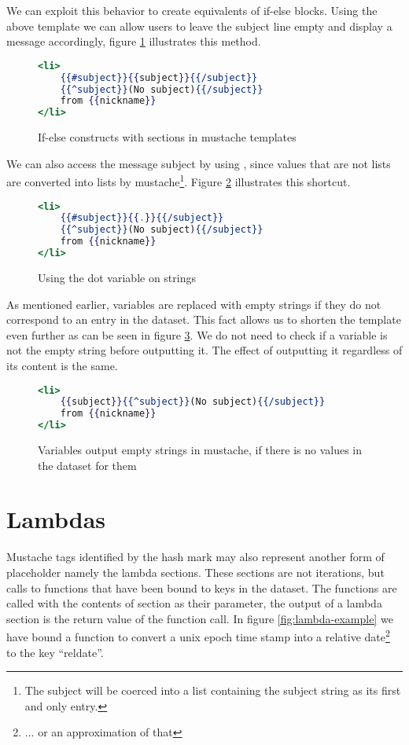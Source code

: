 \documentclass[thesis.tex]{subfiles}
\begin{document}
We can exploit this behavior to create equivalents of if-else blocks.
Using the above template we can allow users to leave the subject line empty
and display a message accordingly, figure \ref{fig:ifelse.mustache} illustrates
this method.
\begin{figure}
	\centering
	\begin{lstlisting}[language=mustache]
<li>
	{{#subject}}{{subject}}{{/subject}}
	{{^subject}}(No subject){{/subject}}
	from {{nickname}}
</li>
	\end{lstlisting}
	\caption{If-else constructs with sections in mustache templates}
	\label{fig:ifelse.mustache}
\end{figure}

We can also access the message subject by using ,
since values that are not lists are converted into lists by
mustache\footnote{The subject will be coerced into a list containing the subject
string as its first and only entry.}.
Figure \ref{fig:dot-oper2.mustache} illustrates this shortcut.

\begin{figure}
	\centering
	\begin{lstlisting}[language=mustache]
<li>
	{{#subject}}{{.}}{{/subject}}
	{{^subject}}(No subject){{/subject}}
	from {{nickname}}
</li>
	\end{lstlisting}
	\caption{Using the dot variable on strings}
	\label{fig:dot-oper2.mustache}
\end{figure}

As mentioned earlier, variables are replaced with empty strings if
they do not correspond to an entry in the dataset.
This fact allows us to shorten the template even further as can be seen in
figure \ref{fig:emptystr.mustache}.
We do not need to check if a variable is not the empty string before outputting
it. The effect of outputting it regardless of its content is the same.

\begin{figure}
	\centering
	\begin{lstlisting}[language=mustache]
<li>
	{{subject}}{{^subject}}(No subject){{/subject}}
	from {{nickname}}
</li>
	\end{lstlisting}
	\caption{Variables output empty strings in mustache, if there is no values in the dataset for them}
	\label{fig:emptystr.mustache}
\end{figure}

\section{Lambdas}
\label{app:mustache-lambda}
Mustache tags identified by the hash mark may also represent another form of
placeholder namely the lambda sections. These sections are not iterations, but
calls to functions that have been bound to keys in the dataset.
The functions are called with the contents of section as their parameter, the
output of a lambda section is the return value of the function call.
In figure \ref{fig:lambda-example} we have bound a function to convert a
unix epoch time stamp into a relative date\footnote{... or an approximation of that}
to the key ``reldate''.
\end{document}
